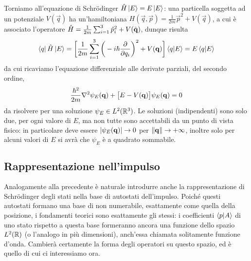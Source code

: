 Torniamo all'equazione di Schr\"odinger $\hat{H}\left|{E}\right\rangle=E\left|{E}\right\rangle$: una particella soggetta ad un potenziale $V(\vec q)$ ha un'hamiltoniana $H(\vec q,\vec p)=\frac1{2m}\vec p^2+V(\vec q)$, a cui è associato l'operatore $\hat{H}=\frac1{2m}\sum_{i=1}^3\hat{p}_i^2+V(\hat{\mathbf{q}})$, dunque risulta
\begin{equation}
	\left\langle{q}\right|\hat{H}\left|{E}\right\rangle=\bigg[\frac1{2m}\sum_{i=1}^3\bigg(-i\hbar\frac{\partial {}}{\partial {q_i}}\bigg)^2+V(\mathbf{q})\bigg]\left\langle{q}\middle|{E}\right\rangle=E\left\langle{q}\middle|{E}\right\rangle
	\label{eq:hamiltoniano-coordinate}
\end{equation}
da cui ricaviamo l'equazione differenziale alle derivate parziali, del secondo ordine,
\begin{equation}
	\frac{\hbar^2}{2m}\nabla^2\psi_E(\mathbf{q})+\big[E-V(\mathbf{q})\big]\psi_E(\mathbf{q})=0
	\label{eq:schroedinger}
\end{equation}
da risolvere per una soluzione $\psi_E\in L^2(\mathbb{R}^3)$.
Le soluzioni (indipendenti) sono solo due, per ogni valore di $E$, ma non tutte sono accettabili da un punto di vista fisico: in particolare deve essere $\left|{\psi_E(\mathbf{q})}\right|\to 0$ per $\left\|{\mathbf{q}}\right\|\to+\infty$, inoltre solo per alcuni valori di $E$ si avrà che $\psi_E$ è a quadrato sommabile.

\subsection{Rappresentazione nell'impulso}
Analogamente alla precedente è naturale introdurre anche la rappresentazione di Schr\"odinger degli stati nella base di autostati dell'impulso.
Poich\'e questi autostati formano una base di non numerabile, esattamente come quella della posizione, i fondamenti teorici sono esattamente gli stessi: i coefficienti $\left\langle{p}\middle|{A}\right\rangle$ di uno stato rispetto a questa base formeranno ancora una funzione dello spazio $L^2(\mathbb{R})$ (o l'analogo in più dimensioni), anch'essa chiamata solitamente funzione d'onda.
Cambierà certamente la forma degli operatori su questo spazio, ed è quello di cui ci interessiamo ora.

